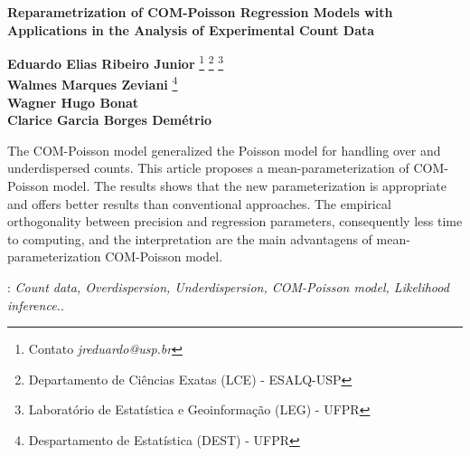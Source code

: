 \documentclass[12pt, a4paper]{article}
\begin{document}
\onehalfspacing

\begin{center}
\begin{center}
\textbf{\Large{Reparametrization of COM-Poisson Regression Models with
    Applications in the Analysis of Experimental Count Data}}\\[1em]
\end{center}
\end{center}
\vspace*{0.2cm}

\begin{flushright}
  {\bf Eduardo Elias Ribeiro Junior}
  \footnote[$\dagger$]{Contato \textit{jreduardo@usp.br}}
  \footnote[1]{Departamento de Ciências Exatas (LCE) - ESALQ-USP}
  \footnote[3]{Laboratório de Estatística e Geoinformação (LEG) -
    UFPR}\\
  {\bf Walmes Marques Zeviani} \footnote[2]{
    Despartamento de Estatística (DEST) - UFPR} \footnotemark[3]\\
  {\bf Wagner Hugo Bonat} \footnotemark[2] \footnotemark[3]\\
  {\bf Clarice Garcia Borges Demétrio} \footnotemark[1]
\end{flushright}

\vspace*{0.5cm}


\noindent
The COM-Poisson model generalized the Poisson model for handling over
and underdispersed counts. This article proposes a
mean-parameterization of COM-Poisson model. The results shows that the
new parameterization is appropriate and offers better results than
conventional approaches. The empirical orthogonality between precision
and regression parameters, consequently less time to computing, and the
interpretation are the main advantagens of mean-parameterization
COM-Poisson model.

: {\it Count data, Overdispersion,
  Underdispersion, COM-Poisson model, Likelihood inference.}.\\
\end{document}
